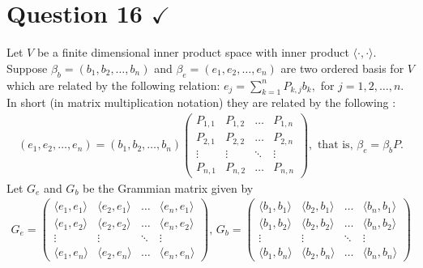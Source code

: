 \section{Question 16 \texorpdfstring{$\checkmark$}{}}
\horz
Let $V$ be a finite dimensional inner product space with inner product $\langle\cdot ,\cdot \rangle.$ Suppose $\beta_b= (b_1,b_2,\ldots,b_n)$ and  $\beta_e=(e_1,e_2,\ldots,e_n)$ are two ordered basis for $V$ which are related by the following relation:
$e_ j= \sum_{k=1}^n P_{k,j}b_k,$ for $j=1,2,\ldots,n.$ In short (in matrix multiplication notation) they are related by the following :
\begin{align*} \label{Basis change matrix}
(e_1,e_2,\ldots,e_n)= (b_1,b_2,\ldots,b_n)\begin{pmatrix}
P_{1,1} & P_{1,2}& \ldots & P_{1,n}\\
P_{2,1} & P_{2,2}& \ldots & P_{2,n}\\
\vdots & \vdots & \ddots & \vdots\\
P_{n,1} & P_{n,2}& \ldots & P_{n,n}
\end{pmatrix},  \,\,\mbox{that is,}\,\,\beta_e=\beta_b P.
\end{align*}
Let $G_e$ and $G_b$  be the Grammian matrix given by 
\begin{align*}
G_e= \begin{pmatrix}
\langle e_1,e_1\rangle & \langle e_2,e_1\rangle & \ldots & \langle e_n,e_1\rangle\\
\langle e_1,e_2\rangle & \langle e_2,e_2\rangle & \ldots & \langle e_n,e_2\rangle\\
\vdots & \vdots & \ddots & \vdots\\
\langle e_1,e_n\rangle & \langle e_2,e_n\rangle & \ldots & \langle e_n,e_n\rangle
\end{pmatrix}, \,G_b= \begin{pmatrix}
\langle b_1,b_1\rangle & \langle b_2,b_1\rangle & \ldots & \langle b_n,b_1\rangle\\
\langle b_1,b_2\rangle & \langle b_2,b_2\rangle & \ldots & \langle b_n,b_2\rangle\\
\vdots & \vdots & \ddots & \vdots\\
\langle b_1,b_n\rangle & \langle b_2,b_n\rangle & \ldots & \langle b_n,b_n\rangle
\end{pmatrix}
\end{align*}
